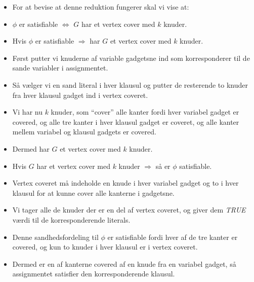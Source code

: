 \begin{frame}[allowframebreaks]
\begin{itemize}
\begin{itemize}
		      \end{itemize}
		\item For at bevise at denne reduktion fungerer skal vi vise at:
		\item $\phi$ er satisfiable $\iff$ $G$ har et vertex cover med $k$ knuder.
		\item Hvis \(\phi\) er satisfiable \(\Rightarrow\) har $G$ et vertex cover med $k$ knuder.
		\item Først putter vi knuderne af variable gadgetsne ind som korresponderer til de sande variabler i assignmentet.
		\item Så vælger vi en sand literal i hver klausul og putter de resterende to knuder fra hver klausul gadget ind i vertex coveret.
		\item Vi har nu $k$ knuder, som ``cover'' alle kanter fordi hver variabel gadget er covered, og alle tre kanter i hver klausul gadget er coveret, og alle kanter mellem variabel og klausul gadgets er covered.
		\item Dermed har $G$ et vertex cover med $k$ knuder.
		\item Hvis $G$ har et vertex cover med $k$ knuder \(\Rightarrow\) så er $\phi$ satisfiable.
		\item Vertex coveret må indeholde en knude i hver variabel gadget og to i hver klausul for at kunne cover alle kanterne i gadgetsne.
		\item Vi tager alle de knuder der er en del af vertex coveret, og giver dem \textit{TRUE} værdi til de korresponderende literals.
		\item Denne sandhedsfordeling til $\phi$ er satisfiable fordi hver af de tre kanter er covered, og kun to knuder i hver klausul er i vertex coveret.
		\item Dermed er en af kanterne covered af en knude fra en variabel gadget, så assignmentet satisfier den korresponderende klausul.
	\end{itemize}
\end{frame}

